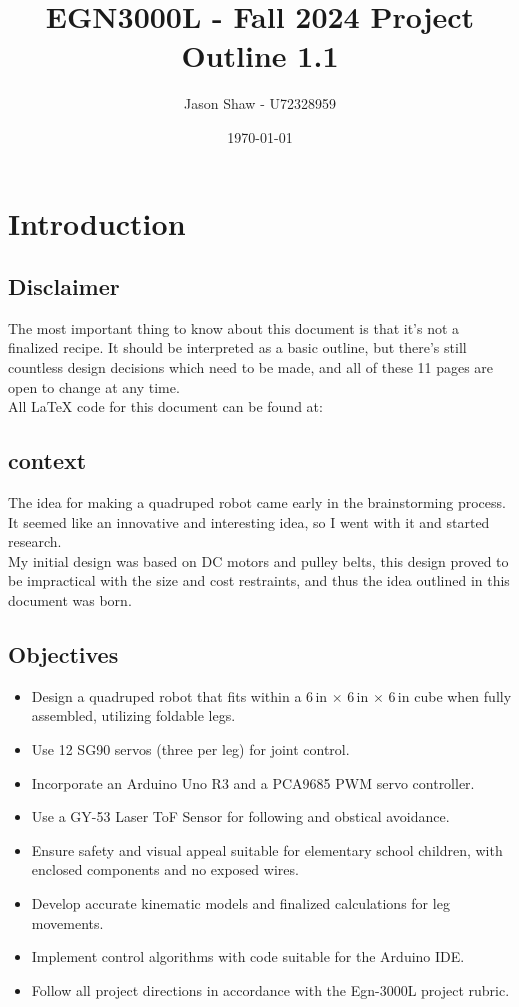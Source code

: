 \documentclass{article}
\begin{document}
\title{EGN3000L - Fall 2024 Project Outline 1.1}
\author{Jason Shaw - U72328959}
\date{\today}
\maketitle

\tableofcontents

\newpage

\section{Introduction}

\subsection{Disclaimer}
The most important thing to know about this document is that it's not a finalized recipe. It should be interpreted as a basic outline, but there's still countless design decisions which need to be made, and all of these 11 pages are open to change at any time.\\

All LaTeX code for this document can be found at: 

\subsection{context}
The idea for making a quadruped robot came early in the brainstorming process. It seemed like an innovative and interesting idea, so I went with it and started research.\\
My initial design was based on DC motors and pulley belts, this design proved to be impractical with the size and cost restraints, and thus the idea outlined in this document was born.

\subsection{Objectives}

\begin{itemize}
    \item Design a quadruped robot that fits within a 6\,in $\times$ 6\,in $\times$ 6\,in cube when fully assembled, utilizing foldable legs.
    \item Use 12 SG90 servos (three per leg) for joint control.
    \item Incorporate an Arduino Uno R3 and a PCA9685 PWM servo controller.
    \item Use a GY-53 Laser ToF Sensor for following and obstical avoidance. 
    \item Ensure safety and visual appeal suitable for elementary school children, with enclosed components and no exposed wires.
    \item Develop accurate kinematic models and finalized calculations for leg movements.
    \item Implement control algorithms with code suitable for the Arduino IDE.
    \item Follow all project directions in accordance with the Egn-3000L project rubric. 
\end{itemize}
\end{document}
